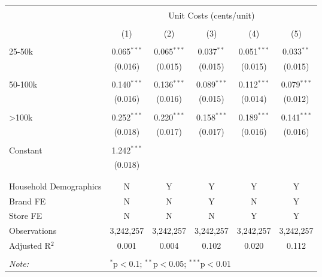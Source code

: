 
\begin{table}[!htbp] \centering 
  \caption{} 
  \label{} 
\begin{tabular}{@{\extracolsep{5pt}}lccccc} 
\\[-1.8ex]\hline 
\hline \\[-1.8ex] 
 & \multicolumn{5}{c}{Unit Costs (cents/unit)} \\ 
\cline{2-6} 
\\[-1.8ex] & (1) & (2) & (3) & (4) & (5)\\ 
\hline \\[-1.8ex] 
 25-50k & 0.065$^{***}$ & 0.065$^{***}$ & 0.037$^{**}$ & 0.051$^{***}$ & 0.033$^{**}$ \\ 
  & (0.016) & (0.015) & (0.015) & (0.015) & (0.015) \\ 
  & & & & & \\ 
 50-100k & 0.140$^{***}$ & 0.136$^{***}$ & 0.089$^{***}$ & 0.112$^{***}$ & 0.079$^{***}$ \\ 
  & (0.016) & (0.016) & (0.015) & (0.014) & (0.012) \\ 
  & & & & & \\ 
 >100k & 0.252$^{***}$ & 0.220$^{***}$ & 0.158$^{***}$ & 0.189$^{***}$ & 0.141$^{***}$ \\ 
  & (0.018) & (0.017) & (0.017) & (0.016) & (0.016) \\ 
  & & & & & \\ 
 Constant & 1.242$^{***}$ &  &  &  &  \\ 
  & (0.018) &  &  &  &  \\ 
  & & & & & \\ 
\hline \\[-1.8ex] 
Household Demographics & N & Y & Y & Y & Y \\ 
Brand FE & N & N & Y & N & Y \\ 
Store FE & N & N & N & Y & Y \\ 
Observations & 3,242,257 & 3,242,257 & 3,242,257 & 3,242,257 & 3,242,257 \\ 
Adjusted R$^{2}$ & 0.001 & 0.004 & 0.102 & 0.020 & 0.112 \\ 
\hline 
\hline \\[-1.8ex] 
\textit{Note:}  & \multicolumn{5}{l}{$^{*}$p$<$0.1; $^{**}$p$<$0.05; $^{***}$p$<$0.01} \\ 
\end{tabular} 
\end{table} 
